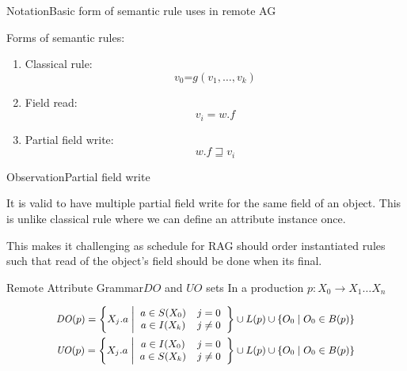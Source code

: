 \begin{frame}{Notation}{Basic form of semantic rule uses in remote AG}

Forms of semantic rules:

\begin{enumerate}
    \item Classical rule: $$v_0 \texttt{=} g(v_1, \dots, v_k) $$
    \item Field read: $$v_i = w.f$$
    \item Partial field write: $$w.f \sqsupseteq v_i$$
\end{enumerate}

\end{frame}


\begin{frame}{Observation}{Partial field write}

It is valid to have \alert{multiple partial field write} for the same field of an object. This is \alert{unlike classical rule} where we can define an attribute instance \alert{once}.

\newlinevspace

This makes it challenging as schedule for RAG should order instantiated rules such that \alert{read of the object's field} should be done when its \alert{final}. 

\end{frame}

\begin{frame}{Remote Attribute Grammar}{$\mathit{DO}$ and $\mathit{UO}$ sets}
In a production $p: X_0 \rightarrow X_1 \dots X_n$

\begin{equation}
\small
\begin{gathered}
\mathit{DO}(p) = \left \{ X_j.a \; \middle\vert
    \begin{array}{cc}
     a \in S(X_0) & j = 0 \\
     a \in I(X_k) & j \neq 0
    \end{array}
\right \} \cup L(p) \cup 
\{ O_0 \mid O_0 \in B(p)  \} \\
\mathit{UO}(p) = \left \{ X_j.a \; \middle\vert
    \begin{array}{cc}
     a \in I(X_0) & j = 0 \\
     a \in S(X_k) & j \neq 0
    \end{array}
\right \} \cup L(p) \cup \{ O_0 \mid O_0 \in B(p)  \}
\end{gathered}
\end{equation}
\end{frame}

